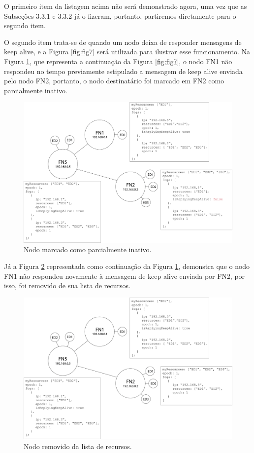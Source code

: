 O primeiro item da listagem acima não será demonstrado agora, uma vez que as Subseções 3.3.1 e 3.3.2 já o fizeram, portanto, partiremos diretamente para o segundo item.

O segundo item trata-se de quando um nodo deixa de responder mensagens de keep alive, e a Figura \ref{fig:fig7} será utilizada para ilustrar esse funcionamento.
Na Figura \ref{fig:fig8}, que representa a continuação da Figura \ref{fig:fig7}, o nodo FN1 não respondeu no tempo previamente estipulado a mensagem de keep alive enviada pelo nodo FN2, 
portanto, o nodo destinatário foi marcado em FN2 como parcialmente inativo.


\begin{figure}[H]
    \centering\includegraphics[width=.8\textwidth]{fig8.png}
    \caption [Nodo marcado como parcialmente inativo]
    {\label{fig:fig8} Nodo marcado como parcialmente inativo.}
\end{figure}

Já a Figura \ref{fig:fig9} representada como continuação da Figura \ref{fig:fig8}, demonstra que o nodo FN1 não respondeu novamente à mensagem de keep alive enviada por FN2, por isso, foi removido de sua lista de recursos. 

\begin{figure}[h!]
    \centering\includegraphics[width=.8\textwidth]{fig9.png}
    \caption [Nodo removido da lista de recursos]
    {\label{fig:fig9} Nodo removido da lista de recursos.}
\end{figure}

